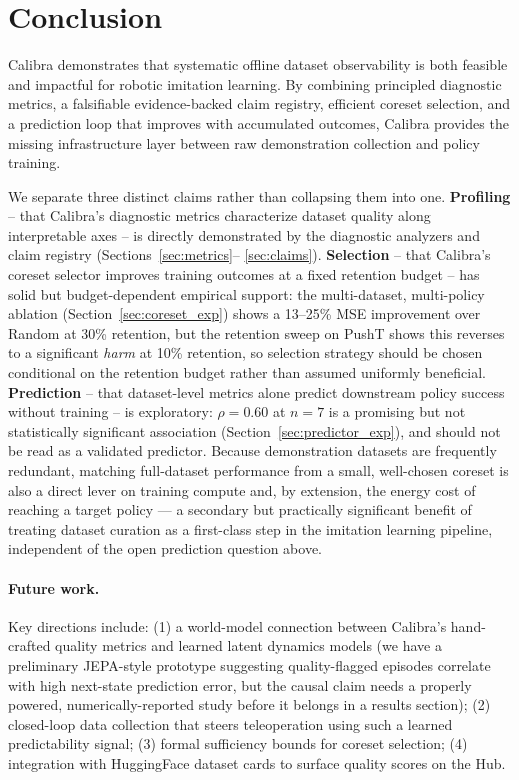 \documentclass[10pt,twocolumn]{article}
\begin{document}
\section{Conclusion}
\label{sec:conclusion}

Calibra demonstrates that systematic offline dataset observability is both
feasible and impactful for robotic imitation learning. By combining principled
diagnostic metrics, a falsifiable evidence-backed claim registry, efficient
coreset selection, and a prediction loop that improves with accumulated
outcomes, Calibra provides the missing infrastructure layer between raw
demonstration collection and policy training.

We separate three distinct claims rather than collapsing them into one.
\textbf{Profiling} -- that Calibra's diagnostic metrics characterize dataset
quality along interpretable axes -- is directly demonstrated by the
diagnostic analyzers and claim registry (Sections~\ref{sec:metrics}--
\ref{sec:claims}). \textbf{Selection} -- that Calibra's coreset selector
improves training outcomes at a fixed retention budget -- has solid but
budget-dependent empirical support: the multi-dataset, multi-policy ablation
(Section~\ref{sec:coreset_exp}) shows a 13--25\% MSE improvement over Random
at 30\% retention, but the retention sweep on PushT shows this reverses to a
significant \emph{harm} at 10\% retention, so selection strategy should be
chosen conditional on the retention budget rather than assumed uniformly
beneficial. \textbf{Prediction} -- that dataset-level metrics alone predict
downstream policy success without training -- is exploratory: $\rho = 0.60$
at $n=7$ is a promising but not statistically significant association
(Section~\ref{sec:predictor_exp}), and should not be read as a validated
predictor. Because demonstration datasets are frequently redundant, matching
full-dataset performance from a small, well-chosen coreset is also a direct
lever on training compute and, by extension, the energy cost of reaching a
target policy --- a secondary but practically significant benefit of
treating dataset curation as a first-class step in the imitation learning
pipeline, independent of the open prediction question above.

\paragraph{Future work.}
Key directions include: (1) a world-model connection between Calibra's
hand-crafted quality metrics and learned latent dynamics models (we have a
preliminary JEPA-style prototype suggesting quality-flagged episodes
correlate with high next-state prediction error, but the causal claim needs
a properly powered, numerically-reported study before it belongs in a
results section); (2) closed-loop data collection that steers teleoperation
using such a learned predictability signal; (3) formal sufficiency bounds
for coreset selection; (4) integration with HuggingFace dataset cards to
surface quality scores on the Hub.



\end{document}
